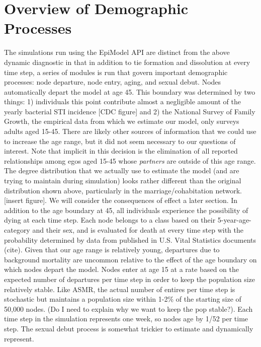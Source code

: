 \documentclass [11pt, proquest] {uwthesis}[2015/03/03]
\begin{document}
\section{Overview of Demographic
Processes}\label{overview-of-demographic-processes}

The simulations run using the EpiModel API are distinct from the above
dynamic diagnostic in that in addition to tie formation and dissolution
at every time step, a series of modules is run that govern important
demographic processes: node departure, node entry, aging, and sexual
debut. Nodes automatically depart the model at age 45. This boundary was
determined by two things: 1) individuals this point contribute almost a
negligible amount of the yearly bacterial STI incidence {[}CDC figure{]}
and 2) the National Survey of Family Growth, the empirical data from
which we estimate our model, only surveys adults aged 15-45. There are
likely other sources of information that we could use to increase the
age range, but it did not seem necessary to our questions of interest.
Note that implicit in this decision is the elimination of all reported
relationships among egos aged 15-45 whose \emph{partners} are outside of
this age range. The degree distribution that we actually use to estimate
the model (and are trying to maintain during simulation) looks rather
different than the original distribution shown above, particularly in
the marriage/cohabitation network. {[}insert figure{]}. We will consider
the consequences of effect a later section. In addition to the age
boundary at 45, all individuals experience the possibility of dying at
each time step. Each node belongs to a class based on their
5-year-age-category and their sex, and is evaluated for death at every
time step with the probability determined by data from published in U.S.
Vital Statistics documents (cite). Given that our age range is
relatively young, departures due to background mortality are uncommon
relative to the effect of the age boundary on which nodes depart the
model. Nodes enter at age 15 at a rate based on the expected number of
departures per time step in order to keep the population size relatively
stable. Like ASMR, the actual number of entires per time step is
stochastic but maintains a population size within 1-2\% of the starting
size of 50,000 nodes. (Do I need to explain why we want to keep the pop
stable?). Each time step in the simulation represents one week, so nodes
age by 1/52 per time step. The sexual debut process is somewhat trickier
to estimate and dynamically represent.
\end{document}
